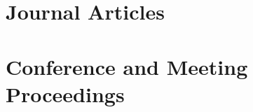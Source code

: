 \documentclass[letterpaper,12pt]{article}
\begin{document}
\newpage
\section{Journal Articles}
\begin{refsection}
\nocite{*}
\printbibliography[heading=none]
\end{refsection}


\section{Conference and Meeting Proceedings}
\begin{refsection}
\nocite{*}
\printbibliography[heading=none]
\end{refsection}

\vfill
{}
\end{document}
